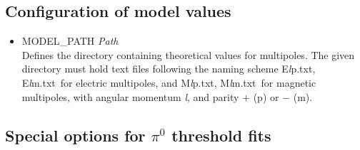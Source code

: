 \documentclass[a4paper,10pt]{article}
\def\tt{\ttfamily}
\def\rm{\rmfamily}
\begin{document}
\subsection{Configuration of model values}

\begin{itemize}
\item
\tt MODEL\_PATH \textit{Path}\rm\\
Defines the directory containing theoretical values for multipoles. The given directory must hold text files
following the naming scheme \tt E\textit{l}p.txt\rm,
\tt E\textit{l}m.txt\rm\ 
for electric multipoles, and
\tt M\textit{l}p.txt\rm,
\tt M\textit{l}m.txt\rm\ 
for magnetic multipoles, with angular momentum \tt\textit{l}\rm, and parity 
$+$ (\tt p\rm) or $-$ (\tt m\rm).

\end{itemize}

\subsection{Special options for $\pi^0$ threshold fits}
\end{document}
